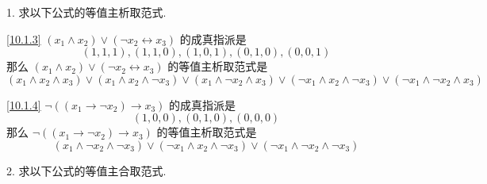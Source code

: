 \documentclass[boxes]{homework}
\begin{document}
\begin{problem}
1. 求以下公式的等值主析取范式.
\end{problem}
\begin{solution}
    \ref{10.1.3} $(x_1\land x_2)\lor (\lnot x_2\leftrightarrow x_3)$ 的成真指派是
    \begin{equation}
        (1,1,1), (1,1,0), (1,0,1), (0,1,0), (0,0,1)
    \end{equation}
    那么 $(x_1\land x_2)\lor (\lnot x_2\leftrightarrow x_3)$ 的等值主析取范式是
    \begin{equation}
        (x_1\land x_2\land x_3)\lor (x_1\land x_2\land\lnot x_3)\lor (x_1\land\lnot x_2\land x_3)\lor (\lnot x_1\land x_2\land\lnot x_3)\lor (\lnot x_1\land\lnot x_2\land x_3)
    \end{equation}

    \ref{10.1.4} $\lnot ((x_1\to\lnot x_2)\to x_3)$ 的成真指派是
    \begin{equation}
        (1,0,0), (0,1,0), (0,0,0)
    \end{equation}
    那么 $\lnot ((x_1\to\lnot x_2)\to x_3)$ 的等值主析取范式是
    \begin{equation}
        (x_1\land\lnot x_2\land\lnot x_3)\lor (\lnot x_1\land x_2\land\lnot x_3) \lor (\lnot x_1\land\lnot x_2\land\lnot x_3)
    \end{equation}
\end{solution}
\begin{problem}
2. 求以下公式的等值主合取范式.
\setcounter{enumi}{2}
\end{problem}
\end{document}
